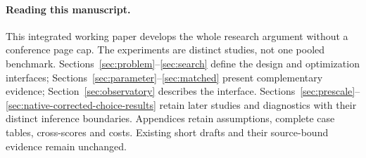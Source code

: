 \documentclass{article}
\begin{document}
\clearpage
\begingroup
\fontsize{8}{9}\selectfont
\setlength{\parskip}{0pt}
\makeatletter
\renewcommand*\l@section{\@dottedtocline{1}{0em}{2.5em}}
\makeatother
\tableofcontents
\endgroup
\clearpage
\paragraph{Reading this manuscript.}
This integrated working paper develops the whole research argument without a
conference page cap. The experiments are distinct studies, not one pooled
benchmark. Sections~\ref{sec:problem}--\ref{sec:search} define the design and
optimization interfaces; Sections~\ref{sec:parameter}--\ref{sec:matched} present
complementary evidence; Section~\ref{sec:observatory} describes the interface.
Sections~\ref{sec:prescale}--\ref{sec:native-corrected-choice-results} retain later studies and
diagnostics with their distinct inference boundaries.
Appendices retain assumptions, complete case tables, cross-scores and costs.
Existing short drafts and their source-bound evidence remain unchanged.
























\FloatBarrier
\clearpage
{}
{}
\begingroup
\raggedright
\setlength{\bibsep}{3pt plus 1pt minus 1pt}


\endgroup
\clearpage
\appendix

\end{document}
